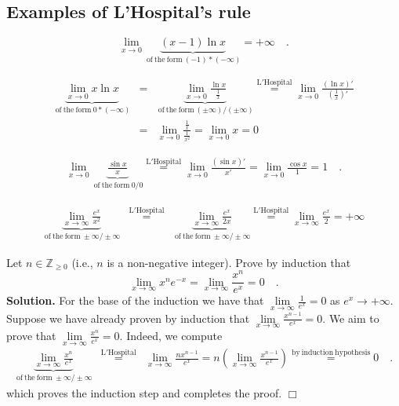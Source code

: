 \documentclass[12pt]{book}
\newenvironment{solution}{\medskip\noindent\textbf{Solution.} }{$\Box$}
\begin{document}
\subsection{Examples of L'Hospital's rule}
\[
\lim\limits_{x\to 0} \underbrace{(x-1)\ln x}_{\mathrm{~of~the~form~}(-1)*(-\infty)} =+\infty\quad .
\]

\[\begin{array}{rcl}
\underbrace{\lim\limits_{x\to 0} x\ln x}_{\mathrm{~of~the~form~}0*(-\infty)} &=&\underbrace{\lim\limits_{x\to 0} \frac{\ln x}{\frac{1}{x}}}_{\mathrm{~of~the~form~}(\pm\infty)/(\pm\infty)}\stackrel{\mathrm{L'Hospital}}{=}\lim\limits_{x\to 0} \frac{(\ln x)'}{\left(\frac{1}{x}\right)'}\\&=& \lim\limits_{x\to 0} \frac{\frac{1}{x}}{\frac{1}{x^2}}=  \lim\limits_{x\to 0} x =0
\end{array}
\]

\[
\begin{array}{rcl}
\lim\limits_{x\to 0} \underbrace{\frac{\sin x}x}_{\mathrm{~of~the~form~}0/0}\stackrel{\mathrm{L'Hospital}}{=} \lim\limits_{x\to 0} \frac{(\sin x)'}{x'}= \lim\limits_{x\to 0} \frac{\cos x}{1}= 1\quad .
\end{array}
\]

\[
\begin{array}{rcl}
\underbrace{\lim\limits_{x\to \infty} \frac{e^x}{x^2}}_{\mathrm{~of~the~form~}\pm \infty/\pm\infty} &\stackrel{\mathrm{L'Hospital}}{=} & \underbrace{\lim\limits_{x\to \infty} \frac{e^x}{2x}}_{\mathrm{~of~the~form~}\pm \infty/\pm\infty}\stackrel{\mathrm{L'Hospital}}{=}\lim\limits_{x\to \infty} \frac{e^x}{2}= +\infty
\end{array}
\]

Let $n\in \mathbb Z_{\geq 0}$ (i.e., $n$ is a non-negative integer). Prove by induction that
\begin{equation}\label{eqLimiteMinusXtimesxtoNth}
\lim\limits_{x\to \infty} x^ne^{-x} = \lim\limits_{x\to \infty}\frac{ x^n}{e^{x}}=0\quad .
\end{equation}
\begin{solution}
For the base of the induction we have that $\lim\limits_{x\to \infty}\frac{1}{e^{x}}=0$ as $e^x\to +\infty$. Suppose we have already proven by induction that $ \lim\limits_{x\to \infty}\frac{x^{n-1}}{e^{x}}=0$. We aim to prove that $ \lim\limits_{x\to \infty}\frac{x^{n}}{e^{x}}=0$. Indeed, we compute
\[
\begin{array}{rcl}
\underbrace{\lim\limits_{x\to \infty} \frac{x^n}{e^x}}_{\mathrm{~of~the~form~}\pm \infty/\pm\infty} &\stackrel{\mathrm{L'Hospital}}{=} & \lim\limits_{x\to \infty} \frac{nx^{n-1}}{e^x}=n\left( \lim\limits_{x\to \infty} \frac{x^{n-1}}{e^x}\right) \stackrel{\mathrm{by~induction~hypothesis}}{=}0\quad .
\end{array}
\]
which proves the induction step and completes the proof.
\end{solution}
\end{document}
